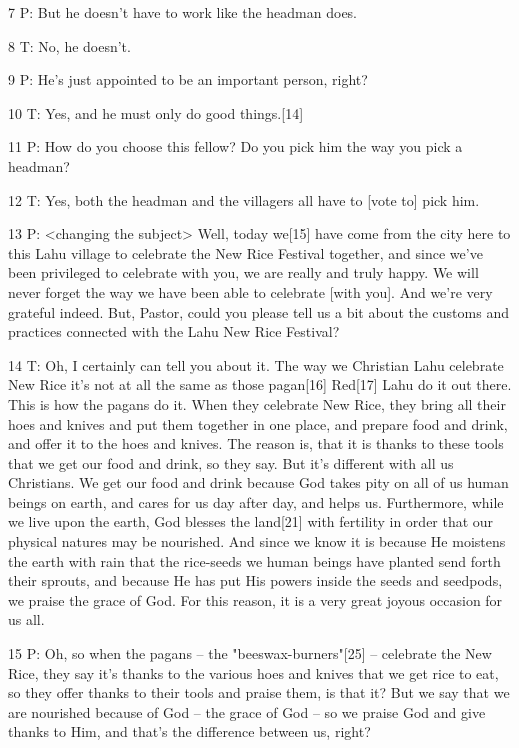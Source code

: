 {7 P: But he doesn't have to work like the headman does.}

{8 T: No, he doesn't. }

{9 P: He's just appointed to be an important person, right?}

{10 T: Yes, and he must only do good things.[14]}

{11 P: How do you choose this fellow? Do you pick him the way you pick a
headman?}

{12 T: Yes, both the headman and the villagers all have to [vote to] pick
him.}

{13 P: <changing the subject> Well, today we[15] have
come from the city here to this Lahu village to celebrate the New Rice Festival
together, and since we've been privileged to celebrate with you, we are really
and truly happy. We will never forget the way we have been able to celebrate [with
you]. And we're very grateful indeed. But, Pastor, could you please tell us a bit
about the customs and practices connected with the Lahu New Rice Festival? }

{14 T: Oh, I certainly can tell you about it. The way we Christian Lahu
celebrate New Rice it's not at all the same as those pagan[16] Red[17] Lahu do
it out there. This is how the pagans do it. When they celebrate New Rice, they
bring all their hoes and knives and put them together in one place, and prepare
food and drink, and offer it to the hoes and knives. The reason is, that it is
thanks to these tools that we get our food and drink, so they say. But it's different
with all us Christians. We get our food and drink because God takes pity on all
of us human beings on earth, and cares for us day after day, and helps us. Furthermore,
while we live upon the earth, God blesses the land[21] with fertility in order
that our physical natures may be nourished. And since we know it is because He
moistens the earth with rain that the rice-seeds we human beings have planted send
forth their sprouts, and because He has put His powers inside the seeds and seedpods,
we praise the grace of God. For this reason, it is a very great joyous occasion
for us all.}

{15 P: Oh, so when the pagans -- the "beeswax-burners"[25]
-- celebrate the New Rice, they say it's thanks to the various hoes and knives
that we get rice to eat, so they offer thanks to their tools and praise them, is
that it? But we say that we are nourished because of God -- the grace of God --
so we praise God and give thanks to Him, and that's the difference between us,
right? }

